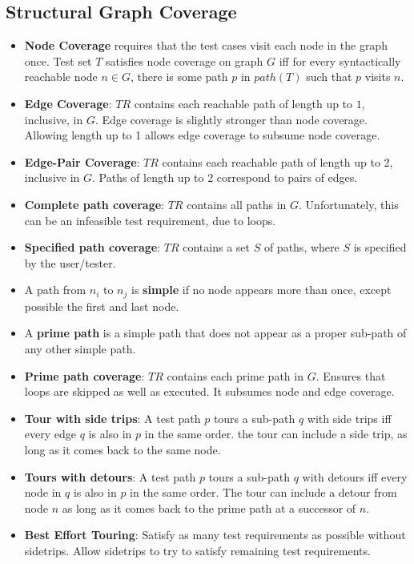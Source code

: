 \documentclass[a4paper]{article}
\begin{document}
\subsection{Structural Graph Coverage}
\begin{itemize}
    \item \textbf{Node Coverage} requires that the test cases visit each node in the graph once. Test set $T$ satisfies node coverage on graph $G$ iff for every syntactically reachable node $n\in G$, there is some path $p$ in $path(T)$ such that $p$ visits $n$.
    \item \textbf{Edge Coverage}: $TR$ contains each reachable path of length up to $1$, inclusive, in $G$. Edge coverage is slightly stronger than node coverage. Allowing length up to 1 allows edge coverage to subsume node coverage.
    \item \textbf{Edge-Pair Coverage}: $TR$ contains each reachable path of length up to 2, inclusive in $G$. Paths of length up to 2 correspond to pairs of edges.
    \item \textbf{Complete path coverage}: $TR$ contains all paths in $G$. Unfortunately, this can be an infeasible test requirement, due to loops.
    \item \textbf{Specified path coverage}: $TR$ contains a set $S$ of paths, where $S$ is specified by the user/tester.
    \item A path from $n_i$ to $n_j$ is \textbf{simple} if no node appears more than once, except possible the first and last node.
    \item A \textbf{prime path} is a simple path that does not appear as a proper sub-path of any other simple path.
    \item \textbf{Prime path coverage}: $TR$ contains each prime path in $G$. Ensures that loops are skipped as well as executed. It subsumes node and edge coverage.
    \item \textbf{Tour with side trips}: A test path $p$ tours a sub-path $q$ with side trips iff every edge $q$ is also in $p$ in the same order. the tour can include a side trip, as long as it comes back to the same node.
    \item \textbf{Tours with detours}: A test path $p$ tours a sub-path $q$ with detours iff every node in $q$ is also in $p$ in the same order. The tour can include a detour from node $n$ as long as it comes back to the prime path at a successor of $n$.
    \item \textbf{Best Effort Touring}: Satisfy as many test requirements as possible without sidetrips. Allow sidetrips to try to satisfy remaining test requirements.

\end{itemize}
\end{document}
